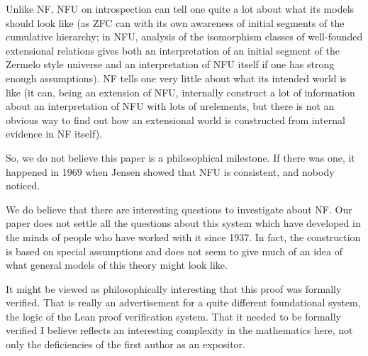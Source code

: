 \documentclass[112pt]{article}
\theoremstyle{definition}
\theoremstyle{remark}
\begin{document}
Unlike NF, NFU on introspection can tell one quite a lot about what its models should look like (as ZFC can with its own awareness of initial segments of the cumulative hierarchy; in NFU, analysis of the isomorphism classes of well-founded extensional relations gives both an interpretation of an initial segment of the Zermelo style universe and an interpretation of NFU itself if one has strong enough assumptions).    NF tells one very little about what its intended world is like (it can, being an extension of NFU, internally construct a lot of information about an interpretation of NFU with lots of urelements, but there is not an obvious way to find out how an extensional world is constructed from internal evidence in NF itself).

So, we do not believe this paper is a philosophical milestone.  If there was one, it happened in 1969 when Jensen showed that NFU is consistent, and nobody noticed.

We do believe that there are interesting questions to investigate about NF.  Our paper does not settle all the questions about this system which have developed in the minds of people who have worked with it since 1937.  In fact, the construction is based on special assumptions  and does not seem to give much of an idea of what general models of this theory might look like.

It might be viewed as philosophically interesting that this proof was formally verified.  That is really an advertisement for a quite different foundational system, the logic of the Lean proof verification system.   That it needed to be formally verified I believe reflects an interesting complexity in the mathematics here, not only the deficiencies of the first author as an expositor.



\newpage
\end{document}
